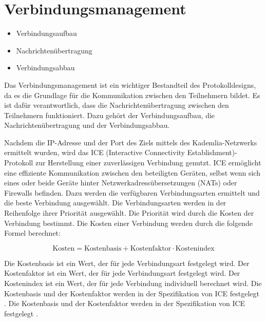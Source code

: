 \section{Verbindungsmanagement}
\label{subsec:routing}

\begin{itemize}
    \item Verbindungsaufbau
    \item Nachrichtenübertragung
    \item Verbindungsabbau
\end{itemize}


\noindent Das Verbindungsmanagement ist ein wichtiger Bestandteil des Protokolldesigns, da es die Grundlage für die Kommunikation zwischen den Teilnehmern bildet. Es ist dafür verantwortlich, dass die Nachrichtenübertragung zwischen den Teilnehmern funktioniert. Dazu gehört der Verbindungsaufbau, die Nachrichtenübertragung und der Verbindungsabbau.

Nachdem die IP-Adresse und der Port des Ziels mittels des Kademlia-Netzwerks ermittelt wurden, wird das ICE (Interactive Connectivity Establishment)-Protokoll zur Herstellung einer zuverlässigen Verbindung genutzt. ICE ermöglicht eine effiziente Kommunikation zwischen den beteiligten Geräten, selbst wenn sich eines oder beide Geräte hinter Netzwerkadressübersetzungen (NATs) oder Firewalls befinden. Dazu werden die verfügbaren Verbindungsarten ermittelt und die beste Verbindung ausgewählt. Die Verbindungsarten werden in der Reihenfolge ihrer Priorität ausgewählt. Die Priorität wird durch die Kosten der Verbindung bestimmt. Die Kosten einer Verbindung werden durch die folgende Formel berechnet:

\begin{equation}
    \label{eq:ice_kosten}
    \text{Kosten} = \text{Kostenbasis} + \text{Kostenfaktor} \cdot \text{Kostenindex}
\end{equation}

\noindent Die Kostenbasis ist ein Wert, der für jede Verbindungsart festgelegt wird. Der Kostenfaktor ist ein Wert, der für jede Verbindungsart festgelegt wird. Der Kostenindex ist ein Wert, der für jede Verbindung individuell berechnet wird. Die Kostenbasis und der Kostenfaktor werden in der Spezifikation von ICE festgelegt \parencite[S. 15]{rfc8445_ICE}. Die Kostenbasis und der Kostenfaktor werden in der Spezifikation von ICE festgelegt \parencite[S. 15]{rfc8445_ICE}.






